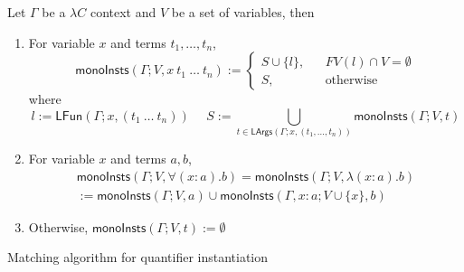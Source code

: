 \begin{definition}
  Let $\Gamma$ be a $\lambda C$ context and $V$ be a set of variables, then
  \begin{enumerate}
    \item For variable $x$ and terms $t_1, \dots, t_n$,
      $$\mathsf{monoInsts}(\Gamma; V, x \ t_1 \ \dots \ t_n) := \left\{
        \begin{aligned}
          S \cup \{l\}, & & FV(l) \cap V = \emptyset \\
          S, & & \text{otherwise}
        \end{aligned}
      \right.$$
      where
      $$l := \mathsf{LFun}(\Gamma; x, (t_1 \ \dots \ t_n)) \ \ \ \ \ \ S := \bigcup_{t \in \mathsf{LArgs}(\Gamma; x, (t_1, \dots, t_n))} \mathsf{monoInsts}(\Gamma; V, t)$$
    \item For variable $x$ and terms $a, b$,
      \begin{align*}
        \mathsf{monoInsts}(\Gamma; V, \forall (x : a). b) = \mathsf{monoInsts}(\Gamma; V, \lambda (x : a). b) 
        \\ := \mathsf{monoInsts}(\Gamma; V, a) \cup \mathsf{monoInsts}(\Gamma, x : a; V \cup \{x\}, b)
      \end{align*}
    \item Otherwise, $\mathsf{monoInsts}(\Gamma; V, t) := \emptyset$
  \end{enumerate}
\end{definition}

\begin{algorithm}\label{matching}
  \DontPrintSemicolon
  \SetNoFillComment
  \caption{Matching algorithm for quantifier instantiation}
\end{algorithm}

